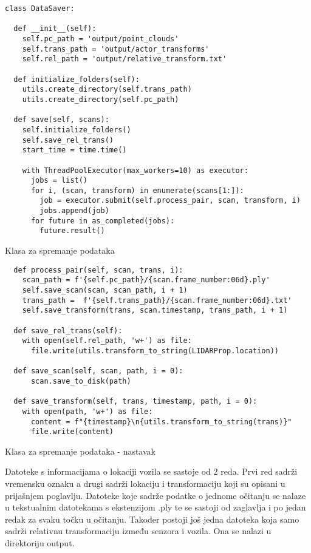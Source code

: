 \begin{listing}[!ht]
  \begin{verbatim}
class DataSaver:

  def __init__(self):
    self.pc_path = 'output/point_clouds'
    self.trans_path = 'output/actor_transforms'
    self.rel_path = 'output/relative_transform.txt'

  def initialize_folders(self):
    utils.create_directory(self.trans_path)
    utils.create_directory(self.pc_path)

  def save(self, scans):
    self.initialize_folders()
    self.save_rel_trans()
    start_time = time.time()

    with ThreadPoolExecutor(max_workers=10) as executor:
      jobs = list()
      for i, (scan, transform) in enumerate(scans[1:]):
        job = executor.submit(self.process_pair, scan, transform, i)
        jobs.append(job)
      for future in as_completed(jobs):
        future.result()

  \end{verbatim}
  \caption{Klasa za spremanje podataka}
  \label{coderef:data_saver}
\end{listing}

\begin{listing}[!ht]
  \begin{verbatim}
  def process_pair(self, scan, trans, i):
    scan_path = f'{self.pc_path}/{scan.frame_number:06d}.ply'
    self.save_scan(scan, scan_path, i + 1)
    trans_path =  f'{self.trans_path}/{scan.frame_number:06d}.txt'
    self.save_transform(trans, scan.timestamp, trans_path, i + 1)

  def save_rel_trans(self):
    with open(self.rel_path, 'w+') as file:
      file.write(utils.transform_to_string(LIDARProp.location))

  def save_scan(self, scan, path, i = 0):
      scan.save_to_disk(path)

  def save_transform(self, trans, timestamp, path, i = 0):
    with open(path, 'w+') as file:
      content = f"{timestamp}\n{utils.transform_to_string(trans)}"
      file.write(content)
  \end{verbatim}
  \caption{Klasa za spremanje podataka - nastavak}
  \label{coderef:data_saver_cont}
\end{listing}

Datoteke s informacijama o lokaciji vozila se sastoje od 2 reda. Prvi red sadrži vremensku oznaku a drugi sadrži lokaciju i transformaciju koji su opisani u prijašnjem poglavlju. Datoteke koje sadrže podatke o jednome očitanju se nalaze u tekstualnim datotekama s ekstenzijom .ply te se sastoji od zaglavlja i po jedan redak za svaku točku u očitanju. Također postoji još jedna datoteka koja samo sadrži relativnu transformaciju između senzora i vozila. Ona se nalazi u direktoriju output.
